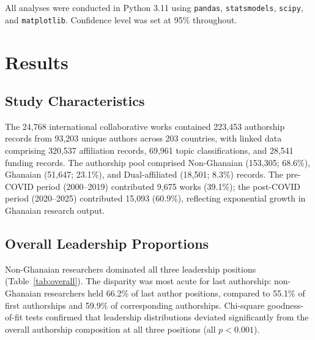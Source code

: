 \documentclass[12pt, a4paper]{article}
\begin{document}
All analyses were conducted in Python 3.11 using \texttt{pandas}, \texttt{statsmodels}, \texttt{scipy}, and \texttt{matplotlib}. Confidence level was set at 95\% throughout.

\section{Results}

\subsection{Study Characteristics}

The 24,768 international collaborative works contained 223,453 authorship records from 93,203 unique authors across 203 countries, with linked data comprising 320,537 affiliation records, 69,961 topic classifications, and 28,541 funding records. The authorship pool comprised Non-Ghanaian (153,305; 68.6\%), Ghanaian (51,647; 23.1\%), and Dual-affiliated (18,501; 8.3\%) records. The pre-COVID period (2000--2019) contributed 9,675 works (39.1\%); the post-COVID period (2020--2025) contributed 15,093 (60.9\%), reflecting exponential growth in Ghanaian research output.

\subsection{Overall Leadership Proportions}

Non-Ghanaian researchers dominated all three leadership positions (Table~\ref{tab:overall}). The disparity was most acute for last authorship: non-Ghanaian researchers held 66.2\% of last author positions, compared to 55.1\% of first authorships and 59.9\% of corresponding authorships. Chi-square goodness-of-fit tests confirmed that leadership distributions deviated significantly from the overall authorship composition at all three positions (all $p < 0.001$).
\end{document}
